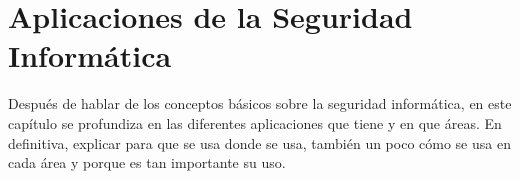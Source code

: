 \chapter[Aplicaciones]{Aplicaciones de la Seguridad Informática}

{\color{red} Después de hablar de los conceptos básicos sobre la seguridad informática, en este capítulo se profundiza en las diferentes aplicaciones que tiene y en que áreas. En definitiva, explicar para que se usa donde se usa, también un poco cómo se usa en cada área y porque es tan importante su uso.}
